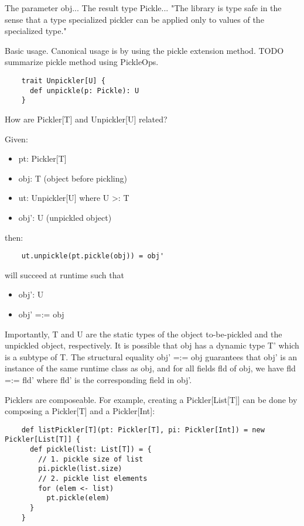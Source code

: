 \documentclass[preprint,10pt]{sigplanconf}
\begin{document}
The parameter obj... The result type Pickle...
"The library is type safe in the sense that a type specialized pickler can be applied only to values of the specialized type."

Basic usage. Canonical usage is by using the pickle extension method. TODO summarize pickle method using PickleOps.

\begin{verbatim}
    trait Unpickler[U] {
      def unpickle(p: Pickle): U
    }
\end{verbatim}
How are Pickler[T] and Unpickler[U] related?

Given:
\begin{itemize}
  \item pt: Pickler[T]
  \item obj: T (object before pickling)
  \item ut: Unpickler[U] where U >: T
  \item obj': U (unpickled object)
\end{itemize}

then:

\begin{verbatim}
    ut.unpickle(pt.pickle(obj)) = obj'
\end{verbatim}

will succeed at runtime such that

\begin{itemize}
  \item obj': U
  \item obj' =:= obj
\end{itemize}

Importantly, T and U are the static types of the object to-be-pickled and the unpickled object, respectively. It is possible that obj has a dynamic type T' which is a subtype of T. The structural equality obj' =:= obj guarantees that obj' is an instance of the same runtime class as obj, and for all fields fld of obj, we have fld =:= fld' where fld' is the corresponding field in obj'.

Picklers are composeable. For example, creating a Pickler[List[T]] can be done by composing a Pickler[T] and a Pickler[Int]:

\begin{verbatim}
    def listPickler[T](pt: Pickler[T], pi: Pickler[Int]) = new Pickler[List[T]] {
      def pickle(list: List[T]) = {
        // 1. pickle size of list
        pi.pickle(list.size)
        // 2. pickle list elements
        for (elem <- list)
          pt.pickle(elem)
      }
    }
\end{verbatim}
\end{document}
